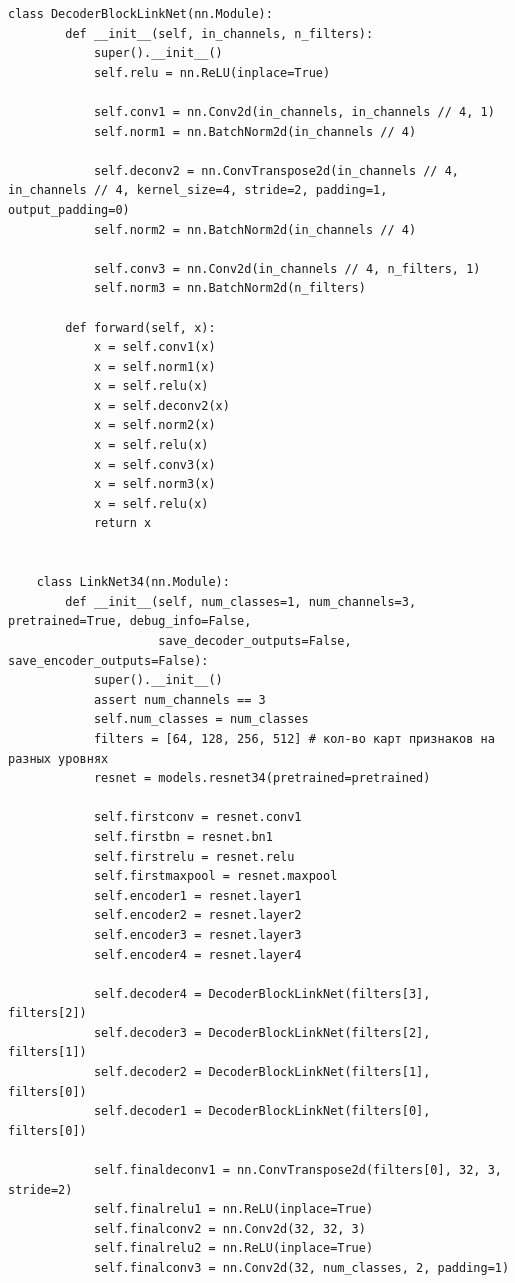 \begin{lstlisting}[python]
    class DecoderBlockLinkNet(nn.Module):
        def __init__(self, in_channels, n_filters):
            super().__init__()
            self.relu = nn.ReLU(inplace=True)

            self.conv1 = nn.Conv2d(in_channels, in_channels // 4, 1)
            self.norm1 = nn.BatchNorm2d(in_channels // 4)

            self.deconv2 = nn.ConvTranspose2d(in_channels // 4, in_channels // 4, kernel_size=4, stride=2, padding=1, output_padding=0)
            self.norm2 = nn.BatchNorm2d(in_channels // 4)

            self.conv3 = nn.Conv2d(in_channels // 4, n_filters, 1)
            self.norm3 = nn.BatchNorm2d(n_filters)

        def forward(self, x):
            x = self.conv1(x)
            x = self.norm1(x)
            x = self.relu(x)
            x = self.deconv2(x)
            x = self.norm2(x)
            x = self.relu(x)
            x = self.conv3(x)
            x = self.norm3(x)
            x = self.relu(x)
            return x


    class LinkNet34(nn.Module):
        def __init__(self, num_classes=1, num_channels=3, pretrained=True, debug_info=False,
                     save_decoder_outputs=False, save_encoder_outputs=False):
            super().__init__()
            assert num_channels == 3
            self.num_classes = num_classes
            filters = [64, 128, 256, 512] # кол-во карт признаков на разных уровнях
            resnet = models.resnet34(pretrained=pretrained)

            self.firstconv = resnet.conv1
            self.firstbn = resnet.bn1
            self.firstrelu = resnet.relu
            self.firstmaxpool = resnet.maxpool
            self.encoder1 = resnet.layer1
            self.encoder2 = resnet.layer2
            self.encoder3 = resnet.layer3
            self.encoder4 = resnet.layer4

            self.decoder4 = DecoderBlockLinkNet(filters[3], filters[2])
            self.decoder3 = DecoderBlockLinkNet(filters[2], filters[1])
            self.decoder2 = DecoderBlockLinkNet(filters[1], filters[0])
            self.decoder1 = DecoderBlockLinkNet(filters[0], filters[0])

            self.finaldeconv1 = nn.ConvTranspose2d(filters[0], 32, 3, stride=2)
            self.finalrelu1 = nn.ReLU(inplace=True)
            self.finalconv2 = nn.Conv2d(32, 32, 3)
            self.finalrelu2 = nn.ReLU(inplace=True)
            self.finalconv3 = nn.Conv2d(32, num_classes, 2, padding=1)


\end{lstlisting}
